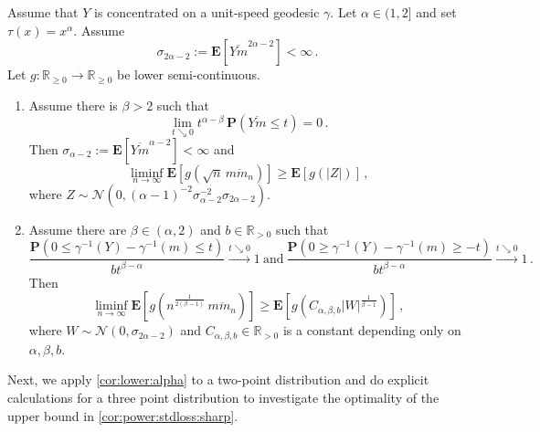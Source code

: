 \documentclass{article}
\newcommand{\R}{\mathbb{R}}
\newcommand{\Rp}{\R_{\geq0}}
\newcommand{\Rpp}{\R_{>0}}
\newcommand{\lab}{\left[} %
\newcommand{\rab}{\right]} %
\newcommand{\ab}[1]{\lab #1 \rab} %
\newcommand{\abOf}[1]{\!\ab{#1}} %
\newcommand{\lb}{\left(} %
\newcommand{\rb}{\right)} %
\newcommand{\br}[1]{\lb #1 \rb} %
\newcommand{\brOf}[1]{\!\br{#1}} %
\renewcommand{\Pr}{\mathbf{P}} %
\newcommand{\Prof}[1]{\Pr(#1)}
\newcommand{\PrOf}[1]{\Pr\brOf{#1}}
\newcommand{\E}{\mathbf{E}} %
\newcommand{\Eof}[1]{\E[#1]}
\newcommand{\EOf}[1]{\E\abOf{#1}}
\newcommand{\eqcm}{\,,} %
\newcommand{\eqfs}{\,.}
\newcommand{\ol}[2]{\overline{#1#2}}
\newcommand{\tran}{\tau}
\begin{document}
\begin{corollary}\label{cor:lower:alpha}
    Assume that $Y$ is concentrated on a unit-speed geodesic $\gamma$.
    Let $\alpha\in(1,2]$ and set $\tran(x)=x^\alpha$.
    Assume
    \begin{equation}
        \sigma_{2\alpha-2}:=\Eof{\ol Ym^{2\alpha-2}}<\infty
        \eqfs
    \end{equation}
    Let $g \colon \Rp \to \Rp$ be lower semi-continuous.
    \begin{enumerate}[label=(\roman*)]
        \item
        Assume there is $\beta>2$ such that
        \begin{equation}
            \lim_{t\searrow0} t^{\alpha-\beta}\,\Prof{\ol Ym\le t}=0
            \eqfs
        \end{equation}
        Then $\sigma_{\alpha-2} := \Eof{\ol Ym^{\alpha-2}}<\infty$ and
        \begin{equation}
            \liminf_{n\to\infty} \EOf{g\brOf{\sqrt{n}\, \ol m{m_n}}} \geq \EOf{g(|Z|)}
            \eqcm
        \end{equation}
        where $Z \sim \mathcal N(0, (\alpha-1)^{-2} \sigma_{\alpha-2}^{-2} \sigma_{2\alpha-2})$.
        \item
        Assume there are $\beta\in(\alpha,2)$ and $b\in\Rpp$ such that
        \begin{equation}
            \frac{\PrOf{0\leq\gamma^{-1}(Y)-\gamma^{-1}(m)\leq t}}{b t^{\beta-\alpha}}
            \xrightarrow{t\searrow 0}
            1
            \ \text{and}\ 
            \frac{\PrOf{0 \geq \gamma^{-1}(Y)-\gamma^{-1}(m) \geq -t}}{b t^{\beta-\alpha}}
            \xrightarrow{t\searrow 0}
            1
            \eqfs
        \end{equation}
        Then
        \begin{equation}
            \liminf_{n\to\infty} \EOf{g\brOf{n^{\frac1{2(\beta-1)}}\, \ol m{m_n}}} \geq \EOf{g\brOf{C_{\alpha,\beta,b} |W|^{\frac1{\beta-1}}}}
            \eqcm
        \end{equation}
        where $W\sim\mathcal N(0,\sigma_{2\alpha-2})$ and $C_{\alpha,\beta,b} \in\Rpp$ is a constant depending only on $\alpha,\beta,b$.
    \end{enumerate} 
\end{corollary}
%
Next, we apply \cref{cor:lower:alpha} to a two-point distribution and do explicit calculations for a three point distribution to investigate the optimality of the upper bound in \cref{cor:power:stdloss:sharp}.
\end{document}
